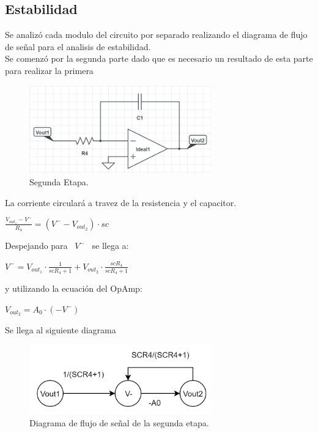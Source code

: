 \subsection{Estabilidad}
Se analizó cada modulo del circuito por separado realizando el diagrama de flujo de señal para el analisis de estabilidad.\\
Se comenzó por la segunda parte dado que es necesario un resultado de esta parte para realizar la primera

\begin{figure}[H]	
	\centering
	\includegraphics[width=0.7\textwidth]{imagenes/SegundaEtapa.PNG}
	\caption{Segunda Etapa.}
	\label{fig:SegundaEtapa}
\end{figure}
La corriente circulará a travez de la resistencia y el capacitor.\\
\begin{center}
$ \frac{V_{out_1}-V^-}{R_4} = (V^--V_{out_2})\cdot sc$ \\
\end{center}
 Despejando para \ $V^-$ \ se llega a: \\
\begin{center}
$V^- = V_{out_1} \cdot \frac{1}{scR_4+1}+V_{out_2} \cdot \frac{scR_4}{scR_4+1}$\\\end{center}
y utilizando la ecuación del OpAmp:\\
\begin{center}
$V_{out_2}=A_0 \cdot (-V^-)$
\end{center}
Se llega al siguiente diagrama
\begin{figure}[H]	
	\centering
	\includegraphics[width=0.7\textwidth]{imagenes/SegundaEtapaDiagrama.PNG}
	\caption{Diagrama de flujo de señal de la segunda etapa.}
	\label{fig:SegundaEtapaDiagrama}
\end{figure}
